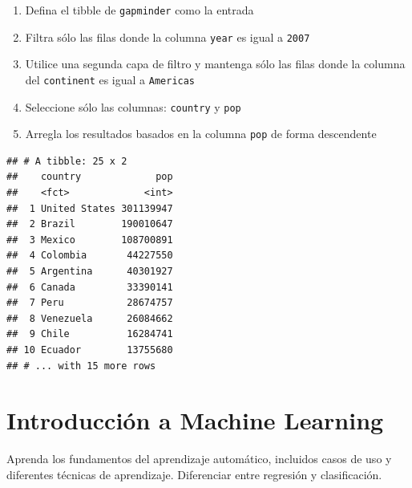 \documentclass[
]{book}
\newenvironment{Shaded}{\begin{snugshade}}{\end{snugshade}}
\newcommand{\DecValTok}[1]{\textcolor[rgb]{0.00,0.00,0.81}{#1}}
\newcommand{\KeywordTok}[1]{\textcolor[rgb]{0.13,0.29,0.53}{\textbf{#1}}}
\newcommand{\NormalTok}[1]{#1}
\newcommand{\OperatorTok}[1]{\textcolor[rgb]{0.81,0.36,0.00}{\textbf{#1}}}
\newcommand{\StringTok}[1]{\textcolor[rgb]{0.31,0.60,0.02}{#1}}
\providecommand{\tightlist}{%
  \setlength{\itemsep}{0pt}\setlength{\parskip}{0pt}}
\begin{document}
\begin{enumerate}
\def\labelenumi{\arabic{enumi}.}
\tightlist
\item
  Defina el tibble de \texttt{gapminder} como la entrada
\item
  Filtra sólo las filas donde la columna \texttt{year} es igual a \texttt{2007}
\item
  Utilice una segunda capa de filtro y mantenga sólo las filas donde la columna del \texttt{continent} es igual a \texttt{Americas}
\item
  Seleccione sólo las columnas: \texttt{country} y \texttt{pop}
\item
  Arregla los resultados basados en la columna \texttt{pop} de forma descendente
\end{enumerate}

\begin{Shaded}
\end{Shaded}

\begin{verbatim}
## # A tibble: 25 x 2
##    country             pop
##    <fct>             <int>
##  1 United States 301139947
##  2 Brazil        190010647
##  3 Mexico        108700891
##  4 Colombia       44227550
##  5 Argentina      40301927
##  6 Canada         33390141
##  7 Peru           28674757
##  8 Venezuela      26084662
##  9 Chile          16284741
## 10 Ecuador        13755680
## # ... with 15 more rows
\end{verbatim}

\hypertarget{introducciuxf3n-a-machine-learning}{%
\chapter{Introducción a Machine Learning}\label{introducciuxf3n-a-machine-learning}}

Aprenda los fundamentos del aprendizaje automático, incluidos casos de uso y diferentes técnicas de aprendizaje. Diferenciar entre regresión y clasificación.
\end{document}
